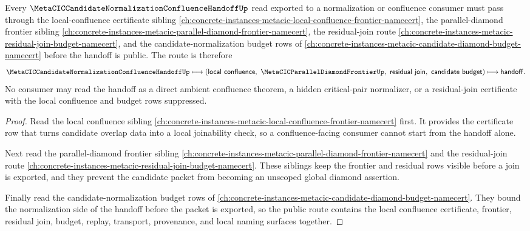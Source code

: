 \begin{theorem}
\label{thm:metacic-candidate-normalization-confluence-handoff-local-confluence-certificate-route}
Every $\MetaCICCandidateNormalizationConfluenceHandoffUp$ read exported to a normalization or confluence consumer must pass through the local-confluence certificate sibling \autoref{ch:concrete-instances-metacic-local-confluence-frontier-namecert}, the parallel-diamond frontier sibling \autoref{ch:concrete-instances-metacic-parallel-diamond-frontier-namecert}, the residual-join route \autoref{ch:concrete-instances-metacic-residual-join-budget-namecert}, and the candidate-normalization budget rows of \autoref{ch:concrete-instances-metacic-candidate-diamond-budget-namecert} before the handoff is public. The route is therefore
$$
\MetaCICCandidateNormalizationConfluenceHandoffUp
\longmapsto
(\mathsf{local\ confluence},\ \MetaCICParallelDiamondFrontierUp,\ \mathsf{residual\ join},\ \mathsf{candidate\ budget})
\longmapsto
\mathsf{handoff}.
$$
No consumer may read the handoff as a direct ambient confluence theorem, a hidden critical-pair normalizer, or a residual-join certificate with the local confluence and budget rows suppressed.
\end{theorem}
\begin{proof}
Read the local confluence sibling \autoref{ch:concrete-instances-metacic-local-confluence-frontier-namecert} first. It provides the certificate row that turns candidate overlap data into a local joinability check, so a confluence-facing consumer cannot start from the handoff alone.

Next read the parallel-diamond frontier sibling \autoref{ch:concrete-instances-metacic-parallel-diamond-frontier-namecert} and the residual-join route \autoref{ch:concrete-instances-metacic-residual-join-budget-namecert}. These siblings keep the frontier and residual rows visible before a join is exported, and they prevent the candidate packet from becoming an unscoped global diamond assertion.

Finally read the candidate-normalization budget rows of \autoref{ch:concrete-instances-metacic-candidate-diamond-budget-namecert}. They bound the normalization side of the handoff before the packet is exported, so the public route contains the local confluence certificate, frontier, residual join, budget, replay, transport, provenance, and local naming surfaces together.
\end{proof}
